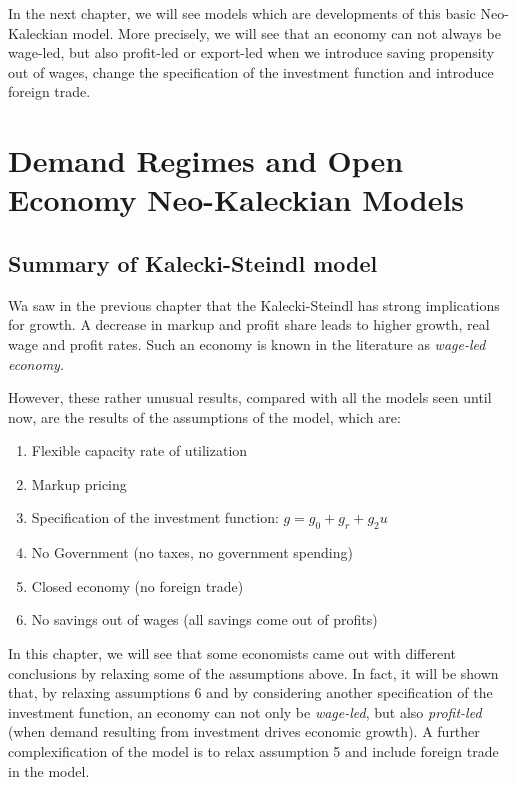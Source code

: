\documentclass[
  letterpaper,
  DIV=11,
  numbers=noendperiod]{scrreprt}
\providecommand{\tightlist}{%
  \setlength{\itemsep}{0pt}\setlength{\parskip}{0pt}}\usepackage{longtable,booktabs,array}
\begin{document}
In the next chapter, we will see models which are developments of this
basic Neo-Kaleckian model. More precisely, we will see that an economy
can not always be wage-led, but also profit-led or export-led when we
introduce saving propensity out of wages, change the specification of
the investment function and introduce foreign trade.

\hypertarget{demand-regimes-and-open-economy-neo-kaleckian-models}{%
\chapter{Demand Regimes and Open Economy Neo-Kaleckian
Models}\label{demand-regimes-and-open-economy-neo-kaleckian-models}}

\hypertarget{summary-of-kalecki-steindl-model}{%
\section{Summary of Kalecki-Steindl
model}\label{summary-of-kalecki-steindl-model}}

Wa saw in the previous chapter that the Kalecki-Steindl has strong
implications for growth. A decrease in markup and profit share leads to
higher growth, real wage and profit rates. Such an economy is known in
the literature as \emph{wage-led economy}.

However, these rather unusual results, compared with all the models seen
until now, are the results of the assumptions of the model, which are:

\begin{enumerate}
\def\labelenumi{\arabic{enumi}.}
\tightlist
\item
  Flexible capacity rate of utilization
\item
  Markup pricing
\item
  Specification of the investment function: \(g = g_0 + g_r + g_2u\)
\item
  No Government (no taxes, no government spending)
\item
  Closed economy (no foreign trade)
\item
  No savings out of wages (all savings come out of profits)
\end{enumerate}

In this chapter, we will see that some economists came out with
different conclusions by relaxing some of the assumptions above. In
fact, it will be shown that, by relaxing assumptions 6 and by
considering another specification of the investment function, an economy
can not only be \emph{wage-led}, but also \emph{profit-led} (when demand
resulting from investment drives economic growth). A further
complexification of the model is to relax assumption 5 and include
foreign trade in the model.
\end{document}
